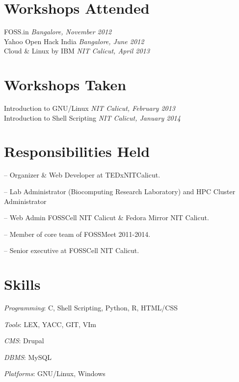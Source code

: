 \documentclass[margin,line]{resume}
\begin{document}
\begin{resume}
    \section{\mysidestyle Workshops Attended} 
	FOSS.in \hfill \textit{Bangalore, November 2012}  \\%
    Yahoo Open Hack India \hfill \textit{Bangalore, June 2012}    \\
    Cloud \& Linux by IBM \hfill \textit{NIT Calicut, April 2013}    \\

            


    \section{\mysidestyle Workshops Taken} 
	Introduction to GNU/Linux \hfill \textit{NIT Calicut, February 2013}    \\
	Introduction to Shell Scripting \hfill \textit{NIT Calicut, January 2014}    \\    			    			

    \section{\mysidestyle Responsibilities Held } 
	\begin{list2}
	\item[--] Organizer \& Web Developer at TEDxNITCalicut.
	\item[--] Lab Administrator (Biocomputing Research Laboratory) and HPC Cluster Administrator
	\item[--] Web Admin FOSSCell NIT Calicut \& Fedora Mirror NIT Calicut.
	\item[--] Member of core team of FOSSMeet 2011-2014.
	\item[--] Senior executive at FOSSCell NIT Calicut.
	
	\end{list2}

    \section{\mysidestyle Skills} 
    	\begin{list2}
	\item \textit{Programming}: C, Shell Scripting, Python, R, HTML/CSS 
	\item \textit{Tools}: LEX, YACC, GIT, VIm
	\item \textit{CMS}: Drupal
	\item \textit{DBMS}: MySQL
	\item \textit{Platforms}: GNU/Linux, Windows
	\end{list2}




\end{resume}
\end{document}
